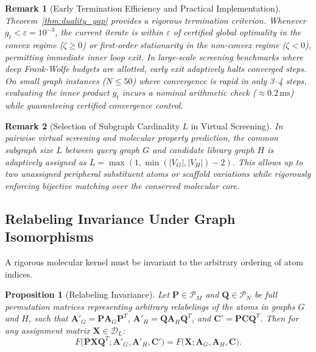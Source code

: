 \documentclass[conference]{IEEEtran}
\newtheorem{proposition}{Proposition}
\newtheorem{remark}{Remark}
\begin{document}
\begin{remark}[Early Termination Efficiency and Practical Implementation]
Theorem~\ref{thm:duality_gap} provides a rigorous termination criterion. Whenever $g_t < \varepsilon = 10^{-3}$, the current iterate is within $\varepsilon$ of certified global optimality in the convex regime ($\zeta \geq 0$) or first-order stationarity in the non-convex regime ($\zeta < 0$), permitting immediate inner loop exit. In large-scale screening benchmarks where deep Frank-Wolfe budgets are allotted, early exit adaptively halts converged steps. On small graph instances ($N \leq 50$) where convergence is rapid in only 3--4 steps, evaluating the inner product $g_t$ incurs a nominal arithmetic check ($\approx 0.2\,\text{ms}$) while guaranteeing certified convergence control.
\end{remark}

\begin{remark}[Selection of Subgraph Cardinality $L$ in Virtual Screening]
In pairwise virtual screening and molecular property prediction, the common subgraph size $L$ between query graph $G$ and candidate library graph $H$ is adaptively assigned as $L = \max(1, \min(|V_G|, |V_H|) - 2)$. This allows up to two unassigned peripheral substituent atoms or scaffold variations while rigorously enforcing bijective matching over the conserved molecular core.
\end{remark}

\subsection{Relabeling Invariance Under Graph Isomorphisms}

A rigorous molecular kernel must be invariant to the arbitrary ordering of atom indices.

\begin{proposition}[Relabeling Invariance]
\label{prop:relabeling}
Let $\mathbf{P} \in \mathcal{P}_M$ and $\mathbf{Q} \in \mathcal{P}_N$ be full permutation matrices representing arbitrary relabelings of the atoms in graphs $G$ and $H$, such that $\mathbf{A}'_G = \mathbf{P}\mathbf{A}_G\mathbf{P}^T$, $\mathbf{A}'_H = \mathbf{Q}\mathbf{A}_H\mathbf{Q}^T$, and $\mathbf{C}' = \mathbf{P}\mathbf{C}\mathbf{Q}^T$. Then for any assignment matrix $\mathbf{X} \in \mathcal{D}_L$:
\begin{equation}
F\big(\mathbf{P}\mathbf{X}\mathbf{Q}^T; \mathbf{A}'_G, \mathbf{A}'_H, \mathbf{C}'\big) = F\big(\mathbf{X}; \mathbf{A}_G, \mathbf{A}_H, \mathbf{C}\big).
\label{eq:relabeling_invariance}
\end{equation}
\end{proposition}
\end{document}

